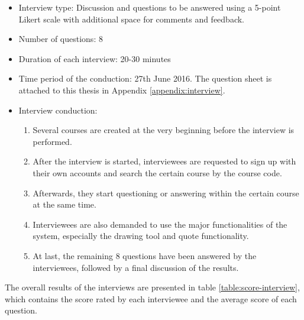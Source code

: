 \begin{itemize}
  \item  Interview type: Discussion and questions to be answered using a 5-point Likert scale with additional space for comments and feedback.
  \item  Number of questions: 8
  \item  Duration of each interview: 20-30 minutes
  \item  Time period of the conduction: 27th June 2016. The question sheet is attached to this thesis in Appendix \ref{appendix:interview}.
  \item  Interview conduction: 
  \begin{enumerate}
    \item Several courses are created at the very beginning before the interview is performed. 
    \item After the interview is started, interviewees are requested to sign up with their own accounts and search the certain course by the course code.
    \item Afterwards, they start questioning or answering within the certain course at the same time.
    \item Interviewees are also demanded to use the major functionalities of the system, especially the drawing tool and quote functionality.
    \item At last, the remaining 8 questions have been answered by the interviewees, followed by a final discussion of the results.
  \end{enumerate}
\end{itemize}

The overall results of the interviews are presented in table \ref{table:score-interview}, which contains the score rated by each interviewee and the average score of each question. 

